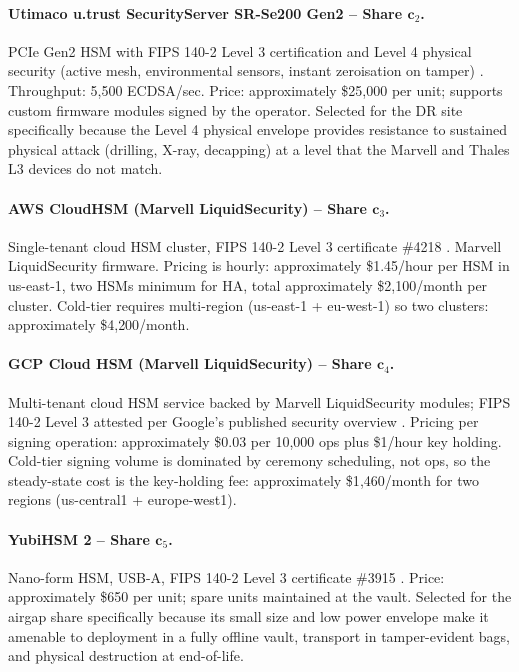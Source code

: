 \paragraph{Utimaco u.trust SecurityServer SR-Se200 Gen2 -- Share $\mathbf{c}_2$.}
PCIe Gen2 HSM with FIPS 140-2 Level 3 certification and Level 4
physical security (active mesh, environmental sensors, instant zeroisation
on tamper) \cite{utimaco-secsr}. Throughput: 5{,}500 ECDSA/sec.
Price: approximately \$25{,}000 per unit; supports custom firmware
modules signed by the operator. Selected for the DR site specifically
because the Level 4 physical envelope provides resistance to
sustained physical attack (drilling, X-ray, decapping) at a level
that the Marvell and Thales L3 devices do not match.

\paragraph{AWS CloudHSM (Marvell LiquidSecurity) -- Share $\mathbf{c}_3$.}
Single-tenant cloud HSM cluster, FIPS 140-2 Level 3 certificate
\#4218 \cite{aws-cloudhsm}. Marvell LiquidSecurity firmware. Pricing
is hourly: approximately \$1.45/hour per HSM in us-east-1, two HSMs
minimum for HA, total approximately \$2{,}100/month per cluster.
Cold-tier requires multi-region (us-east-1 + eu-west-1) so two
clusters: approximately \$4{,}200/month.

\paragraph{GCP Cloud HSM (Marvell LiquidSecurity) -- Share $\mathbf{c}_4$.}
Multi-tenant cloud HSM service backed by Marvell LiquidSecurity
modules; FIPS 140-2 Level 3 attested per Google's published security
overview \cite{gcp-cloudhsm}. Pricing per signing operation:
approximately \$0.03 per 10{,}000 ops plus \$1/hour key holding.
Cold-tier signing volume is dominated by ceremony scheduling, not
ops, so the steady-state cost is the key-holding fee: approximately
\$1{,}460/month for two regions (us-central1 + europe-west1).

\paragraph{YubiHSM 2 -- Share $\mathbf{c}_5$.}
Nano-form HSM, USB-A, FIPS 140-2 Level 3 certificate \#3915
\cite{yubihsm2}. Price: approximately \$650 per unit; spare units
maintained at the vault. Selected for the airgap share specifically
because its small size and low power envelope make it amenable to
deployment in a fully offline vault, transport in tamper-evident
bags, and physical destruction at end-of-life.

